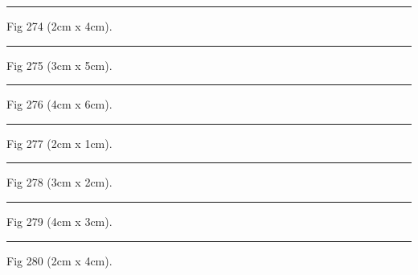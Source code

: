\documentclass[a4paper,11pt]{article}
\begin{document}
\begin{swarmwrap}%
  \begin{minipage}[t]{2cm}
    \centering
    \rule{\linewidth}{4cm}
    {\footnotesize Fig 274 (2cm x 4cm).}
  \end{minipage}%
\end{swarmwrap}%
\swarmwrapnext
\lipsum[124]%

\begin{swarmwrap}%
  \begin{minipage}[t]{3cm}
    \centering
    \rule{\linewidth}{5cm}
    {\footnotesize Fig 275 (3cm x 5cm).}
  \end{minipage}%
\end{swarmwrap}%
\swarmwrapnext
\lipsum[125]%

\begin{swarmwrap}%
  \begin{minipage}[t]{4cm}
    \centering
    \rule{\linewidth}{6cm}
    {\footnotesize Fig 276 (4cm x 6cm).}
  \end{minipage}%
\end{swarmwrap}%
\swarmwrapnext
\lipsum[126]%

\begin{swarmwrap}%
  \begin{minipage}[t]{2cm}
    \centering
    \rule{\linewidth}{1cm}
    {\footnotesize Fig 277 (2cm x 1cm).}
  \end{minipage}%
\end{swarmwrap}%
\swarmwrapnext
\lipsum[127]%

\begin{swarmwrap}%
  \begin{minipage}[t]{3cm}
    \centering
    \rule{\linewidth}{2cm}
    {\footnotesize Fig 278 (3cm x 2cm).}
  \end{minipage}%
\end{swarmwrap}%
\swarmwrapnext
\lipsum[128]%

\begin{swarmwrap}%
  \begin{minipage}[t]{4cm}
    \centering
    \rule{\linewidth}{3cm}
    {\footnotesize Fig 279 (4cm x 3cm).}
  \end{minipage}%
\end{swarmwrap}%
\swarmwrapnext
\lipsum[129]%

\begin{swarmwrap}%
  \begin{minipage}[t]{2cm}
    \centering
    \rule{\linewidth}{4cm}
    {\footnotesize Fig 280 (2cm x 4cm).}
  \end{minipage}%
\end{swarmwrap}%
\swarmwrapnext
\lipsum[130]%
\end{document}

